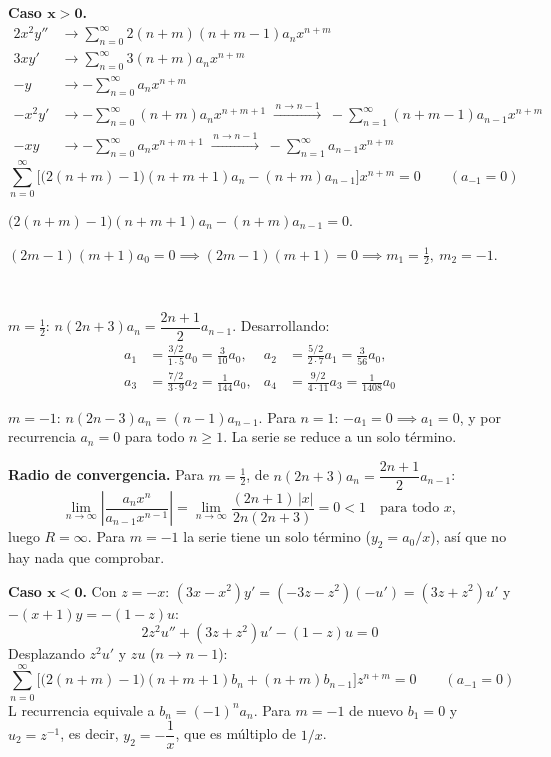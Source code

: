 \documentclass[11pt, a4paper]{article}
\begin{document}
\vspace{0.2cm}\noindent\textbf{Caso $\bm{x>0}$.}
\begin{align*}
2x^2y'' &\to \sum_{n=0}^\infty 2(n+m)(n+m-1)a_nx^{n+m} \\
3xy' &\to \sum_{n=0}^\infty 3(n+m)a_nx^{n+m} \\
-y &\to -\sum_{n=0}^\infty a_nx^{n+m} \\
-x^2y' &\to -\sum_{n=0}^\infty (n+m)a_nx^{n+m+1} \;\xrightarrow{\,n\to n-1\,}\; -\sum_{n=1}^\infty (n+m-1)a_{n-1}x^{n+m} \\
-xy &\to -\sum_{n=0}^\infty a_nx^{n+m+1} \;\xrightarrow{\,n\to n-1\,}\; -\sum_{n=1}^\infty a_{n-1}x^{n+m}
\end{align*}
\[
\sum_{n=0}^\infty\Big[\big(2(n+m)-1\big)(n+m+1)a_n-(n+m)a_{n-1}\Big]x^{n+m}=0 \qquad (a_{-1}=0)
\]

\smallskip\noindent $\big(2(n+m)-1\big)(n+m+1)a_n-(n+m)a_{n-1}=0$.

\smallskip\noindent $(2m-1)(m+1)a_0=0 \implies (2m-1)(m+1)=0 \implies m_1=\tfrac12,\ m_2=-1$.

\

\smallskip\noindent $m=\tfrac12$: $n(2n+3)a_n=\dfrac{2n+1}{2}a_{n-1}$. Desarrollando:
\[
\begin{aligned}a_1&=\frac{3/2}{1\cdot5}a_0=\frac3{10}a_0, & a_2&=\frac{5/2}{2\cdot7}a_1=\frac3{56}a_0, \\ a_3&=\frac{7/2}{3\cdot9}a_2=\frac1{144}a_0, & a_4&=\frac{9/2}{4\cdot11}a_3=\frac{1}{1408}a_0\end{aligned}
\]

\smallskip\noindent $m=-1$: $n(2n-3)a_n=(n-1)a_{n-1}$. Para $n=1$: $-a_1=0\implies a_1=0$, y por recurrencia $a_n=0$ para todo $n\geq1$. La serie se reduce a un solo término.

\smallskip\noindent\textbf{Radio de convergencia.} Para $m=\tfrac12$, de $n(2n+3)a_n=\dfrac{2n+1}{2}a_{n-1}$:
\[
\lim_{n\to\infty}\left|\frac{a_{n}x^{n}}{a_{n-1}x^{n-1}}\right|=\lim_{n\to\infty}\frac{(2n+1)\,|x|}{2n(2n+3)}=0<1 \quad\text{para todo }x,
\]
luego $R=\infty$. Para $m=-1$ la serie tiene un solo término ($y_2=a_0/x$), así que no hay nada que comprobar.

\vspace{0.2cm}\noindent\textbf{Caso $\bm{x<0}$.} Con $z=-x$: $(3x-x^2)y'=(-3z-z^2)(-u')=(3z+z^2)u'$ y $-(x+1)y=-(1-z)u$:
\[
2z^2u''+(3z+z^2)u'-(1-z)u=0
\]
Desplazando $z^2u'$ y $zu$ ($n\to n-1$):
\[
\sum_{n=0}^\infty\Big[\big(2(n+m)-1\big)(n+m+1)b_n+(n+m)b_{n-1}\Big]z^{n+m}=0 \qquad (a_{-1}=0)
\]
L recurrencia equivale a $b_n=(-1)^na_n$. Para $m=-1$ de nuevo $b_1=0$ y $u_2=z^{-1}$, es decir, $y_2=-\dfrac1x$, que es múltiplo de $1/x$.
\end{document}
